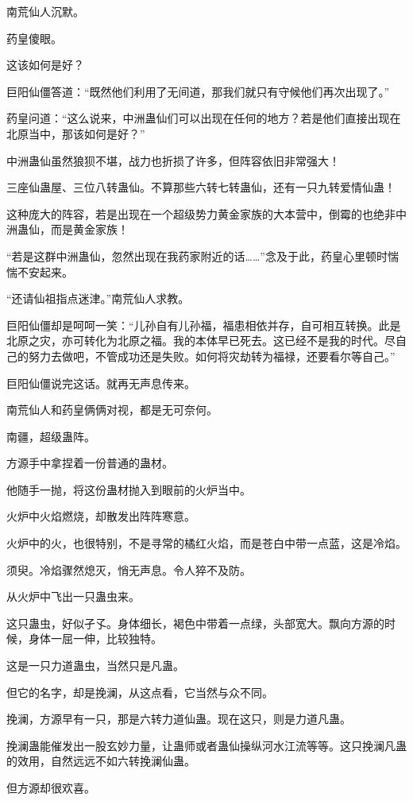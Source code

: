 \begin{this_body}
南荒仙人沉默。

药皇傻眼。

这该如何是好？

巨阳仙僵答道：“既然他们利用了无间道，那我们就只有守候他们再次出现了。”

药皇问道：“这么说来，中洲蛊仙们可以出现在任何的地方？若是他们直接出现在北原当中，那该如何是好？”

中洲蛊仙虽然狼狈不堪，战力也折损了许多，但阵容依旧非常强大！

三座仙蛊屋、三位八转蛊仙。不算那些六转七转蛊仙，还有一只九转爱情仙蛊！

这种庞大的阵容，若是出现在一个超级势力黄金家族的大本营中，倒霉的也绝非中洲蛊仙，而是黄金家族！

“若是这群中洲蛊仙，忽然出现在我药家附近的话……”念及于此，药皇心里顿时惴惴不安起来。

“还请仙祖指点迷津。”南荒仙人求教。

巨阳仙僵却是呵呵一笑：“儿孙自有儿孙福，福患相依并存，自可相互转换。此是北原之灾，亦可转化为北原之福。我的本体早已死去。这已经不是我的时代。尽自己的努力去做吧，不管成功还是失败。如何将灾劫转为福禄，还要看尔等自己。”

巨阳仙僵说完这话。就再无声息传来。

南荒仙人和药皇俩俩对视，都是无可奈何。

南疆，超级蛊阵。

方源手中拿捏着一份普通的蛊材。

他随手一抛，将这份蛊材抛入到眼前的火炉当中。

火炉中火焰燃烧，却散发出阵阵寒意。

火炉中的火，也很特别，不是寻常的橘红火焰，而是苍白中带一点蓝，这是冷焰。

须臾。冷焰骤然熄灭，悄无声息。令人猝不及防。

从火炉中飞出一只蛊虫来。

这只蛊虫，好似孑孓。身体细长，褐色中带着一点绿，头部宽大。飘向方源的时候，身体一屈一伸，比较独特。

这是一只力道蛊虫，当然只是凡蛊。

但它的名字，却是挽澜，从这点看，它当然与众不同。

挽澜，方源早有一只，那是六转力道仙蛊。现在这只，则是力道凡蛊。

挽澜蛊能催发出一股玄妙力量，让蛊师或者蛊仙操纵河水江流等等。这只挽澜凡蛊的效用，自然远远不如六转挽澜仙蛊。

但方源却很欢喜。


\end{this_body}
